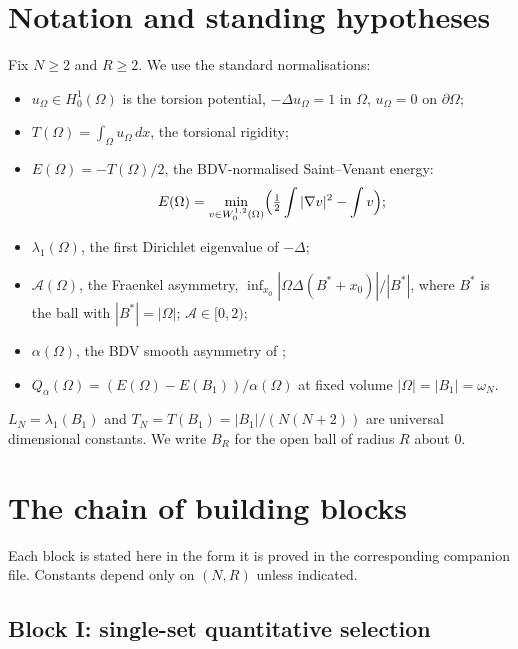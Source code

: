 \documentclass[11pt]{article}
\theoremstyle{definition}
\newcommand{\Fr}{\mathcal{A}}
\newcommand{\Om}{\Omega}
\begin{document}
\section{Notation and standing hypotheses}\label{sec:notation}

Fix $N\ge2$ and $R\ge2$. We use the standard normalisations:
\begin{itemize}
\item $u_\Om\in H^1_0(\Om)$ is the torsion potential, $-\Delta u_\Om=1$
in $\Om$, $u_\Om=0$ on $\partial\Om$;
\item $T(\Om)=\int_\Om u_\Om\,dx$, the torsional rigidity;
\item $E(\Om)=-T(\Om)/2$, the BDV-normalised Saint--Venant energy:
\[
E(\Om)=\min_{v\in W^{1,2}_0(\Om)}\Bigl(\tfrac12\int|\nabla v|^2-\int v\Bigr);
\]
\item $\lambda_1(\Om)$, the first Dirichlet eigenvalue of $-\Delta$;
\item $\Fr(\Om)$, the Fraenkel asymmetry,
$\inf_{x_0}|\Om\Delta(B^*+x_0)|/|B^*|$, where $B^*$ is the ball with
$|B^*|=|\Om|$; $\Fr\in[0,2)$;
\item $\alpha(\Om)$, the BDV smooth asymmetry of
\cite[Def.~4.1]{BDV};
\item $Q_\alpha(\Om)=(E(\Om)-E(B_1))/\alpha(\Om)$ at fixed volume
$|\Om|=|B_1|=\omega_N$.
\end{itemize}
$L_N=\lambda_1(B_1)$ and $T_N=T(B_1)=|B_1|/(N(N+2))$ are universal
dimensional constants. We write $B_R$ for the open ball of radius $R$
about $0$.

\section{The chain of building blocks}\label{sec:chain}

Each block is stated here in the form it is proved in the
corresponding companion file. Constants depend only on $(N,R)$ unless
indicated.

\subsection{Block I: single-set quantitative selection}
\end{document}
